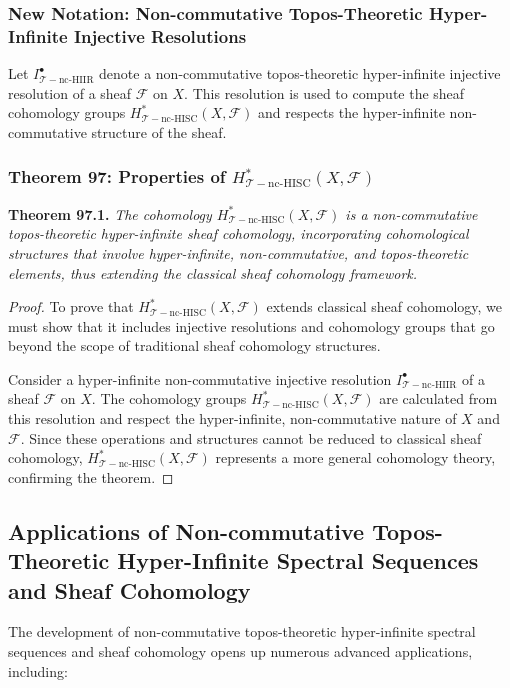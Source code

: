 \documentclass{article}
\begin{document}
\subsubsection{New Notation: Non-commutative Topos-Theoretic Hyper-Infinite Injective Resolutions}
Let \(I^{\bullet}_{\mathcal{T}-\text{nc-HIIR}}\) denote a non-commutative topos-theoretic hyper-infinite injective resolution of a sheaf \(\mathcal{F}\) on \(X\). This resolution is used to compute the sheaf cohomology groups \(H_{\mathcal{T}-\text{nc-HISC}}^{*}(X, \mathcal{F})\) and respects the hyper-infinite non-commutative structure of the sheaf.

\subsubsection{Theorem 97: Properties of \(H_{\mathcal{T}-\text{nc-HISC}}^{*}(X, \mathcal{F})\)}
\textbf{Theorem 97.1.} \textit{The cohomology \(H_{\mathcal{T}-\text{nc-HISC}}^{*}(X, \mathcal{F})\) is a non-commutative topos-theoretic hyper-infinite sheaf cohomology, incorporating cohomological structures that involve hyper-infinite, non-commutative, and topos-theoretic elements, thus extending the classical sheaf cohomology framework.}

\begin{proof}
To prove that \(H_{\mathcal{T}-\text{nc-HISC}}^{*}(X, \mathcal{F})\) extends classical sheaf cohomology, we must show that it includes injective resolutions and cohomology groups that go beyond the scope of traditional sheaf cohomology structures.

Consider a hyper-infinite non-commutative injective resolution \(I^{\bullet}_{\mathcal{T}-\text{nc-HIIR}}\) of a sheaf \(\mathcal{F}\) on \(X\). The cohomology groups \(H_{\mathcal{T}-\text{nc-HISC}}^{*}(X, \mathcal{F})\) are calculated from this resolution and respect the hyper-infinite, non-commutative nature of \(X\) and \(\mathcal{F}\). Since these operations and structures cannot be reduced to classical sheaf cohomology, \(H_{\mathcal{T}-\text{nc-HISC}}^{*}(X, \mathcal{F})\) represents a more general cohomology theory, confirming the theorem.
\end{proof}

\subsection{Applications of Non-commutative Topos-Theoretic Hyper-Infinite Spectral Sequences and Sheaf Cohomology}
The development of non-commutative topos-theoretic hyper-infinite spectral sequences and sheaf cohomology opens up numerous advanced applications, including:
\end{document}
